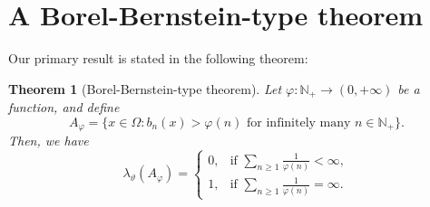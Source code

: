 \documentclass[final,1p,times]{elsarticle}
\newtheorem{theorem}{Theorem}[section]
\numberwithin{equation}{section}
\begin{document}
\section{A Borel-Bernstein-type theorem}
Our primary result is stated in the following theorem:

\begin{theorem} [Borel-Bernstein-type theorem] \label{th.B-B}
Let $\varphi : \mathbb{N}_+ \to (0, +\infty)$ be a function, and define
\[
A_{\varphi} = \{x \in \Omega: b_n(x) > \varphi(n) \text{ for infinitely many } n \in \mathbb{N}_+ \}.
\]
Then, we have
\[
\lambda_{\vartheta} (A_{\varphi}) =
\begin{cases}
0, & \text{if } \sum_{n \geq 1} \frac{1}{\varphi(n)} < \infty, \\
1, & \text{if } \sum_{n \geq 1} \frac{1}{\varphi(n)} = \infty.
\end{cases}
\]
\end{theorem}
\end{document}
